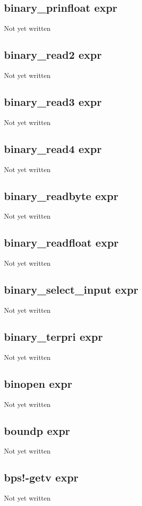 \documentclass[a4paper,11pt]{article}
\begin{document}
\subsection{\ttfamily binary\_prinfloat expr}
Not yet written

\subsection{\ttfamily binary\_read2 expr}
Not yet written

\subsection{\ttfamily binary\_read3 expr}
Not yet written

\subsection{\ttfamily binary\_read4 expr}
Not yet written

\subsection{\ttfamily binary\_readbyte expr}
Not yet written

\subsection{\ttfamily binary\_readfloat expr}
Not yet written

\subsection{\ttfamily binary\_select\_input expr}
Not yet written

\subsection{\ttfamily binary\_terpri expr}
Not yet written

\subsection{\ttfamily binopen expr}
Not yet written

\subsection{\ttfamily boundp expr}
Not yet written

\subsection{\ttfamily bps!-getv expr}
Not yet written
\end{document}
